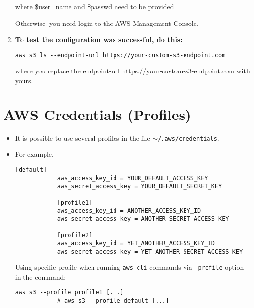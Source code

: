 \documentclass[12pt, a4paper]{scrbook}
\numberwithin{equation}{section}
\theoremstyle{definition}
\theoremstyle{definition}
\begin{document}
\begin{enumerate}
		where \$user\_name and \$passwd need to be provided
		
		Otherwise, you need login to the AWS Management Console. 
		
		\item \textbf{To test the configuration was successful, do this:}
		
		\begin{lstlisting}[style=mystylebash, label=alg:aws_configure_test, xleftmargin=\parindent]
			aws s3 ls --endpoint-url https://your-custom-s3-endpoint.com
		\end{lstlisting}
		
		where you replace the endpoint-url \url{https://your-custom-s3-endpoint.com} with yours.
		
	\end{enumerate}
	
	\section{AWS Credentials (Profiles)}
	
	\begin{itemize}
		\item It is possible to use several profiles in the file \texttt{$\sim$/.aws/credentials}. 
		
		\item For example,
		
		\begin{lstlisting}[style=mystylebash, label=alg:aws_profiles, xleftmargin=\parindent]
			[default]
			aws_access_key_id = YOUR_DEFAULT_ACCESS_KEY
			aws_secret_access_key = YOUR_DEFAULT_SECRET_KEY
			
			[profile1]                                                                   
			aws_access_key_id = ANOTHER_ACCESS_KEY_ID
			aws_secret_access_key = ANOTHER_SECRET_ACCESS_KEY
			
			[profile2]
			aws_access_key_id = YET_ANOTHER_ACCESS_KEY_ID
			aws_secret_access_key = YET_ANOTHER_SECRET_ACCESS_KEY
		\end{lstlisting}
		
		Using specific profile when running \texttt{aws cli} commands via \texttt{--profile} option in the command:
		
		\begin{lstlisting}[style=mystylebash, label=alg:aws_cli__profile, xleftmargin=\parindent]
			aws s3 --profile profile1 [...]
			# aws s3 --profile default [...]
		\end{lstlisting}
		
	\end{itemize}
	
\end{document}
